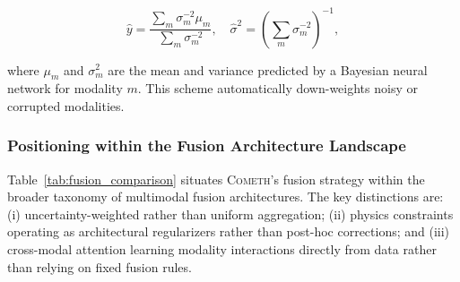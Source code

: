 \documentclass[usenatbib]{mnras}
\begin{document}
\begin{equation}\label{eq:uncertainty_fusion}
\hat{y} = \frac{\sum_m \sigma_m^{-2} \mu_m}{\sum_m \sigma_m^{-2}}, \quad \hat{\sigma}^2 = \left(\sum_m \sigma_m^{-2}\right)^{-1},
\end{equation}

where $\mu_m$ and $\sigma_m^2$ are the mean and variance predicted by a Bayesian neural network for modality $m$. This scheme automatically down-weights noisy or corrupted modalities.

\subsubsection{Positioning within the Fusion Architecture Landscape}

Table~\ref{tab:fusion_comparison} situates \textsc{Cometh}'s fusion strategy within the broader taxonomy of multimodal fusion architectures. The key distinctions are: (i) uncertainty-weighted rather than uniform aggregation; (ii) physics constraints operating as architectural regularizers rather than post-hoc corrections; and (iii) cross-modal attention learning modality interactions directly from data rather than relying on fixed fusion rules.
\end{document}
